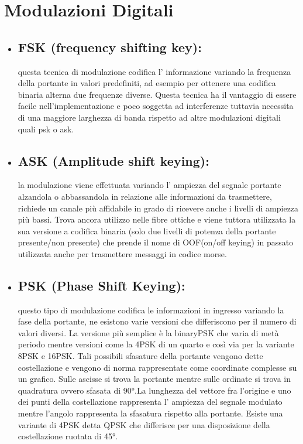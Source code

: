 \section{Modulazioni Digitali}
\label{sec:context}
\begin{itemize}
  \item \subsection{FSK (frequency shifting key): } questa tecnica di modulazione codifica l' informazione variando la frequenza della portante in valori predefiniti, ad esempio per ottenere una codifica binaria alterna due frequenze diverse. Questa tecnica ha il vantaggio di essere facile nell'implementazione e poco soggetta ad interferenze tuttavia necessita di una maggiore larghezza di banda rispetto ad altre modulazioni digitali quali psk o ask.
  \cite{fsk}
  \item \subsection{ASK (Amplitude shift keying): } la modulazione viene effettuata variando l' ampiezza del segnale portante alzandola o abbassandola in relazione alle informazioni da trasmettere, richiede un canale più affidabile in grado di ricevere anche i livelli di ampiezza più bassi. Trova ancora utilizzo nelle fibre ottiche e viene tuttora utilizzata la sua versione a codifica binaria (solo due livelli di potenza della portante presente/non presente) che prende il nome di OOF(on/off keying) in passato utilizzata anche per trasmettere messaggi in codice morse.
  \cite{ask}
  \item \subsection{PSK (Phase Shift Keying): } questo tipo di modulazione codifica le informazioni in ingresso variando la fase della portante, ne esistono varie versioni che differiscono per il numero di valori diversi. La versione più semplice è la binaryPSK che varia di metà periodo mentre versioni come la 4PSK di un quarto e così via per la variante 8PSK e 16PSK. Tali possibili sfasature della portante vengono dette costellazione e vengono di norma rappresentate come coordinate complesse su un grafico. Sulle ascisse si trova la portante mentre sulle ordinate si trova in quadratura ovvero sfasata di 90°.La lunghezza del vettore fra l'origine e uno dei punti della costellazione rappresenta l' ampiezza del segnale modulato mentre l'angolo rappresenta la sfasatura rispetto alla portante. Esiste una variante di 4PSK detta QPSK che differisce per una disposizione della costellazione ruotata di 45°.

\end{itemize}
